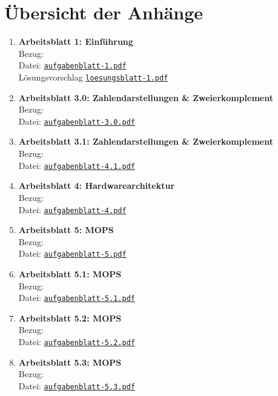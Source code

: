 \documentclass[../skript/main.tex]{subfiles}
\begin{document}
	\section*{Übersicht der Anhänge}
	\begin{enumerate}
		\item \textbf{Arbeitsblatt 1: Einführung}\\
		Bezug: \\
		\small Datei: \hyperlink{ab1}{\texttt{aufgabenblatt-1.pdf}}
		\\ Lösungsvorschlag \hyperlink{lab1}{\texttt{loesungsblatt-1.pdf}}
		
		\item \textbf{Arbeitsblatt 3.0: Zahlendarstellungen \& Zweierkomplement}\\
		Bezug: \\
		\small Datei: \hyperlink{ab3.0}{\texttt{aufgabenblatt-3.0.pdf}}
		
		\item \textbf{Arbeitsblatt 3.1: Zahlendarstellungen \& Zweierkomplement}\\
		Bezug: \\
		\small Datei: \hyperlink{ab3.1}{\texttt{aufgabenblatt-4.1.pdf}}
		
		\item \textbf{Arbeitsblatt 4: Hardwarearchitektur}\\
		Bezug: \\
		\small Datei: \hyperlink{ab4}{\texttt{aufgabenblatt-4.pdf}}
		
		\item \textbf{Arbeitsblatt 5: MOPS}\\
		Bezug: \\
		\small Datei: \hyperlink{ab4}{\texttt{aufgabenblatt-5.pdf}}
		
		\item \textbf{Arbeitsblatt 5.1: MOPS}\\
		Bezug: \\
		\small Datei: \hyperlink{ab5.1}{\texttt{aufgabenblatt-5.1.pdf}}
		
		\item \textbf{Arbeitsblatt 5.2: MOPS}\\
		Bezug: \\
		\small Datei: \hyperlink{ab5.2}{\texttt{aufgabenblatt-5.2.pdf}}
		
		\item \textbf{Arbeitsblatt 5.3: MOPS}\\
		Bezug: \\
		\small Datei: \hyperlink{ab5.3}{\texttt{aufgabenblatt-5.3.pdf}}
	\end{enumerate}
	
\end{document}
